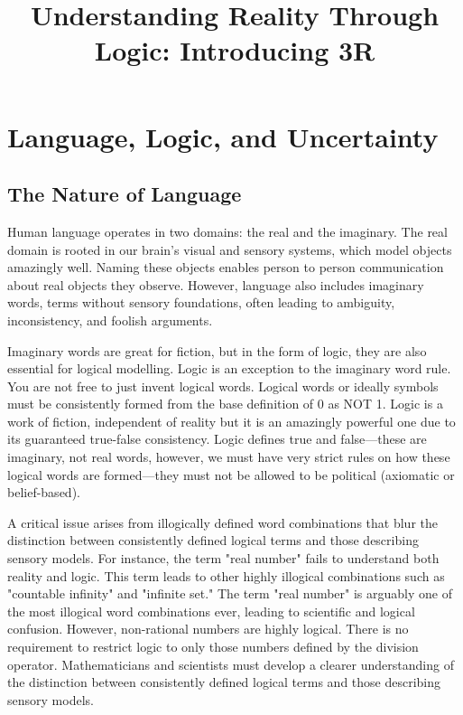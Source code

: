 \documentclass{article}
\title{Understanding Reality Through Logic: Introducing 3R}
\date{}
\begin{document}
\maketitle

\section*{Language, Logic, and Uncertainty}

\subsection*{The Nature of Language}

Human language operates in two domains: the real and the imaginary. The real domain is rooted in our brain's visual and sensory systems, which model objects amazingly well. Naming these objects enables person to person communication about real objects they observe. However, language also includes imaginary words, terms without sensory foundations, often leading to ambiguity, inconsistency, and foolish arguments.

Imaginary words are great for fiction, but in the form of logic, they are also essential for logical modelling. Logic is an exception to the imaginary word rule. You are not free to just invent logical words. Logical words or ideally symbols must be consistently formed from the base definition of 0 as NOT 1. Logic is a work of fiction, independent of reality but it is an amazingly powerful one due to its guaranteed true-false consistency. Logic defines true and false—these are imaginary, not real words, however, we must have very strict rules on how these logical words are formed—they must not be allowed to be political (axiomatic or belief-based).

A critical issue arises from illogically defined word combinations that blur the distinction between consistently defined logical terms and those describing sensory models. For instance, the term "real number" fails to understand both reality and logic. This term leads to other highly illogical combinations such as "countable infinity" and "infinite set." The term "real number" is arguably one of the most illogical word combinations ever, leading to scientific and logical confusion. However, non-rational numbers are highly logical. There is no requirement to restrict logic to only those numbers defined by the division operator. Mathematicians and scientists must develop a clearer understanding of the distinction between consistently defined logical terms and those describing sensory models.
\end{document}
